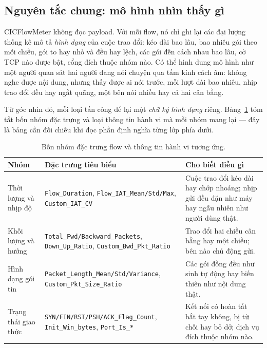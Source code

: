 \documentclass[../DoAn.tex]{subfiles}
\begin{document}
\subsection{Nguyên tắc chung: mô hình nhìn thấy gì}
\label{subsec:mo-hinh-nhin-gi}

CICFlowMeter không đọc payload. Với mỗi flow, nó chỉ ghi lại các đại lượng thống kê mô tả \textit{hình dạng} của cuộc trao đổi: kéo dài bao lâu, bao nhiêu gói theo mỗi chiều, gói to hay nhỏ và đều hay lệch, các gói đến cách nhau bao lâu, cờ TCP nào được bật, cổng đích thuộc nhóm nào. Có thể hình dung mô hình như một người quan sát hai người đang nói chuyện qua tấm kính cách âm: không nghe được nội dung, nhưng thấy được ai nói trước, mỗi lượt dài bao nhiêu, nhịp trao đổi đều hay ngắt quãng, một bên nói nhiều hay cả hai cân bằng.

Từ góc nhìn đó, mỗi loại tấn công để lại một \textit{chữ ký hình dạng} riêng. Bảng~\ref{tab:feature-groups} tóm tắt bốn nhóm đặc trưng và loại thông tin hành vi mà mỗi nhóm mang lại --- đây là bảng cần đối chiếu khi đọc phần định nghĩa từng lớp phía dưới.

\begin{table}[H]
    \centering
    \caption{Bốn nhóm đặc trưng flow và thông tin hành vi tương ứng.}
    \label{tab:feature-groups}
    \begin{tabular}{p{3.1cm}p{4.1cm}p{5.2cm}}
        \hline
        \textbf{Nhóm} & \textbf{Đặc trưng tiêu biểu} & \textbf{Cho biết điều gì} \\
        \hline
        Thời lượng và nhịp độ &
        \texttt{Flow\_Duration}, \texttt{Flow\_IAT\_Mean/Std/Max}, \texttt{Custom\_IAT\_CV} &
        Cuộc trao đổi kéo dài hay chớp nhoáng; nhịp gửi đều đặn như máy hay ngẫu nhiên như người dùng thật. \\[2pt]
        Khối lượng và hướng &
        \texttt{Total\_Fwd/Backward\_Packets}, \texttt{Down\_Up\_Ratio}, \texttt{Custom\_Bwd\_Pkt\_Ratio} &
        Trao đổi hai chiều cân bằng hay một chiều; bên nào chủ động gửi. \\[2pt]
        Hình dạng gói tin &
        \texttt{Packet\_Length\_Mean/Std/Variance}, \texttt{Custom\_Pkt\_Size\_Ratio} &
        Các gói đồng đều như sinh tự động hay biến thiên như nội dung thật. \\[2pt]
        Trạng thái giao thức &
        \texttt{SYN/FIN/RST/PSH/ACK\_Flag\_Count}, \texttt{Init\_Win\_bytes}, \texttt{Port\_Is\_*} &
        Kết nối có hoàn tất bắt tay không, bị từ chối hay bỏ dở; dịch vụ đích thuộc nhóm nào. \\
        \hline
    \end{tabular}
\end{table}
\end{document}

